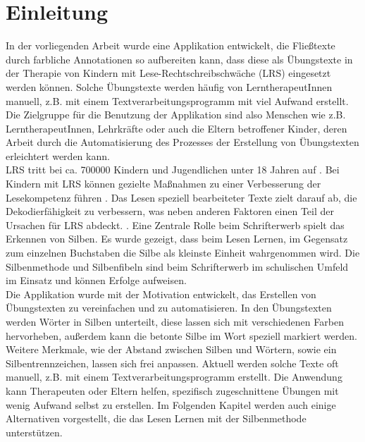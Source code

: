 
\chapter{Einleitung}

In der vorliegenden Arbeit wurde eine Applikation entwickelt, die Fließtexte durch farbliche Annotationen so aufbereiten kann, dass diese als Übungstexte in der Therapie von Kindern mit Lese-Rechtschreibschwäche (LRS) eingesetzt werden können. Solche Übungstexte werden häufig von LerntherapeutInnen manuell, z.B. mit einem Textverarbeitungsprogramm mit viel Aufwand erstellt. Die Zielgruppe für die Benutzung der Applikation sind also Menschen wie z.B. LerntherapeutInnen, Lehrkräfte oder auch die Eltern betroffener Kinder, deren Arbeit durch die Automatisierung des Prozesses der Erstellung von Übungstexten erleichtert werden kann.\\

LRS tritt bei ca. 700000 Kindern und Jugendlichen unter 18 Jahren auf \cite{Schulte-Koerne2014} . Bei Kindern mit LRS können gezielte Maßnahmen zu einer Verbesserung der Lesekompetenz führen . Das Lesen speziell bearbeiteter Texte zielt darauf ab, die Dekodierfähigkeit zu verbessern, was neben anderen Faktoren einen Teil der Ursachen für LRS abdeckt. . Eine Zentrale Rolle beim Schrifterwerb spielt das Erkennen von Silben. Es wurde gezeigt, dass beim Lesen Lernen, im Gegensatz zum einzelnen Buchstaben die Silbe als kleinste Einheit wahrgenommen wird.  Die Silbenmethode und Silbenfibeln sind beim Schrifterwerb im schulischen Umfeld im Einsatz  und können Erfolge aufweisen.\\

Die Applikation wurde mit der Motivation entwickelt, das Erstellen von Übungstexten zu vereinfachen und zu automatisieren. In den Übungstexten werden Wörter in Silben unterteilt, diese lassen sich mit verschiedenen Farben hervorheben, außerdem kann die betonte Silbe im Wort speziell markiert werden. Weitere Merkmale, wie der Abstand zwischen Silben und Wörtern, sowie ein Silbentrennzeichen, lassen sich frei anpassen. Aktuell werden solche Texte oft manuell, z.B. mit einem Textverarbeitungsprogramm erstellt. Die Anwendung kann Therapeuten oder Eltern helfen, spezifisch zugeschnittene Übungen mit wenig Aufwand selbst zu erstellen. Im Folgenden Kapitel werden auch einige Alternativen vorgestellt, die das Lesen Lernen mit der Silbenmethode unterstützen.\\








